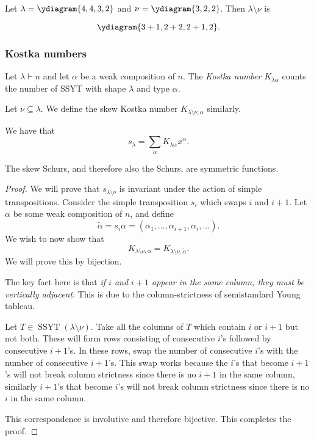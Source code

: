 \documentclass{article}
\DeclareMathOperator{\SSYT}{SSYT}
\begin{document}
\begin{example}
    \ytabsmallbox
    Let $\lambda = \ydiagram{4,4,3,2}$ and $\nu = \ydiagram{3,2,2}$. Then $\lambda \setminus \nu$ is

    \ytabnormalbox
    \[\ydiagram{3+1,2+2,2+1,2}.\]
\end{example}

\subsubsection{Kostka numbers}

\begin{definition}
    Let $\lambda \vdash n$ and let $\alpha$ be a weak composition of $n$. The \textit{Kostka number } $K_{\lambda\alpha}$ counts the number of SSYT with shape $\lambda$ and type $\alpha$.

    Let $\nu \subseteq \lambda$. We define the skew Kostka number $K_{\lambda\setminus\nu,\alpha}$ similarly.
\end{definition}

\begin{remark}
    We have that
    \[
        s_\lambda = \sum_\alpha K_{\lambda\alpha}x^\alpha.
    \]
\end{remark}

\begin{theorem} The skew Schurs, and therefore also the Schurs, are symmetric functions.
\end{theorem}

\begin{proof}
    We will prove that $s_{\lambda\setminus\nu}$ is invariant under the action of simple transpositions. 
    Consider the simple transposition $s_i$ which swaps $i$ and $i+1$. 
    Let $\alpha$ be some weak composition of $n$, and define
    \[
        \tilde{\alpha} = s_i\alpha = (\alpha_1, \ldots, \alpha_{i+1}, \alpha_i, \ldots).
    \]
    We wish to now show that 
    \[
        K_{\lambda\setminus\nu,\alpha} = K_{\lambda\setminus\nu,\tilde{\alpha}}.
    \]
    We will prove this by bijection.

    The key fact here is that \textit{if $i$ and $i+1$ appear in the same column, they must be vertically adjacent}. 
    This is due to the column-strictness of semistandard Young tableau.

    Let $T\in\SSYT(\lambda \setminus \nu)$. 
    Take all the columns of $T$ which contain $i$ or $i+1$ but not both. 
    These will form rows consisting of consecutive $i$'s followed by consecutive $i+1$'s. 
    In these rows, swap the number of consecutive $i$'s with the number of consecutive $i+1$'s. 
    This swap works because the $i$'s that become $i+1$'s will not break column strictness since there is no $i+1$ in the same column, similarly $i+1$'s that become $i$'s will not break column strictness since there is no $i$ in the same column.

    This correspondence is involutive and therefore bijective. This completes the proof.
\end{proof}
\end{document}
